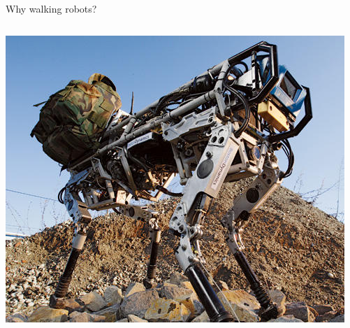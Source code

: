 \documentclass[compress]{beamer}
\begin{document}
\begin{frame}{Why walking robots?}
\begin{columns}
\begin{column}{0.5\linewidth}
\begin{center}
                \includegraphics[width=0.8\linewidth]{image2}
            \end{center}
        \end{column}
    \end{columns}

\end{frame}
\end{document}
